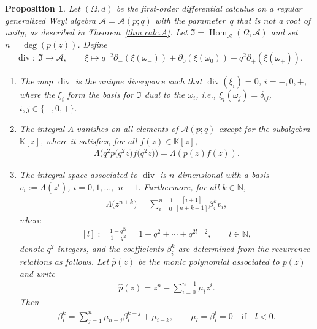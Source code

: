 \documentclass[10pt,a4paper]{amsart}
\numberwithin{equation}{section}
\newtheorem{Proposition}[Theorem]{Proposition}
{ \theoremstyle{definition}
\newtheorem{Definition}[Theorem]{Definition}
\newtheorem{Example}[Theorem]{Example}
\newtheorem{Remark}[Theorem]{Remark} }
\def\AWeyl#1#2{{\mathcal{A}}(#1;#2)}
\def\rhom#1#2#3{{\operatorname{Hom}_{#1}(#2,#3)}}
\begin{document}
\begin{Proposition}\label{prop.int}
Let $(\Omega, d)$ be the first-order differential calculus on a regular generalized Weyl algebra ${\mathcal{A}}= \AWeyl p q$ with the parameter~$q$ that is not a root of unity, as described in Theorem~{\rm \ref{thm.calc.A}}. Let ${\mathfrak I} = \rhom {\mathcal{A}} \Omega {\mathcal{A}}$ and set $n = \deg(p(z))$. Define
\begin{gather}\label{div.A}
\operatorname{div} \colon \ {\mathfrak I} \to {\mathcal{A}}, \qquad \xi \mapsto q^{-2}\partial_-(\xi(\omega_-)) + \partial_0(\xi(\omega_0)) + q^{2}\partial_+(\xi(\omega_+)).
\end{gather}
\begin{enumerate}\itemsep=0pt
\item[$(1)$] The map $\operatorname{div}$ is the unique divergence such that $\operatorname{div}(\xi_i)=0$, $i=-,0,+$, where the $\xi_i$ form the basis for ${\mathfrak I}$ dual to the $\omega_i$, i.e., $\xi_i(\omega_j) = \delta_{ij}$, $i,j\in \{-,0,+\}$.
\item[$(2)$]
The integral $\Lambda$ vanishes on all elements of $\AWeyl p q$ except for the subalgebra ${\mathbb K}[z]$, where it satisfies, for all $f(z) \in {\mathbb K}[z]$,
\begin{gather}\label{lambda.A}
\Lambda\big(q^2 p\big(q^2 z\big)f\big(q^2 z\big)\big) = \Lambda (p(z)f(z) ).
\end{gather}
\item[$(3)$] The integral space associated to $\operatorname{div}$ is $n$-dimensional with a basis $v_i := \Lambda(z^i)$, $i=0,1,\ldots,$ $n-1$. Furthermore, for all $k\in {\mathbb N}$,
\begin{gather}\label{lambda.compact}
\Lambda \big(z^{n+k}\big) = \sum_{i=0}^{n-1} \frac{[i+1]}{[n+k+1]}\beta^k_i v_i,
\end{gather}
where
\begin{gather}\label{q-int}
[l] := \frac{1-q^{2l}}{1-q^2} = 1+ q^2 +\cdots + q^{2l-2}, \qquad l\in {\mathbb N},
\end{gather}
denote $q^2$-integers, and the coefficients $\beta_i^k$ are determined from the recurrence relations as follows. Let $\hat{p}(z)$ be the monic polynomial associated to $p(z)$ and write
\begin{gather}\label{hatp}
\hat{p}(z) = z^n - \sum_{i=0}^{n-1} \mu_i z^i.
\end{gather}
Then
\begin{gather}\label{beta.rec}
\beta_i^k = \sum_{j=1}^n \mu_{n-j}\beta_i^{k-j} +\mu_{i-k}, \qquad \mu_l = \beta^l_i=0 \quad \mbox{if} \quad l<0.
\end{gather}
\end{enumerate}
\end{Proposition}
\end{document}
